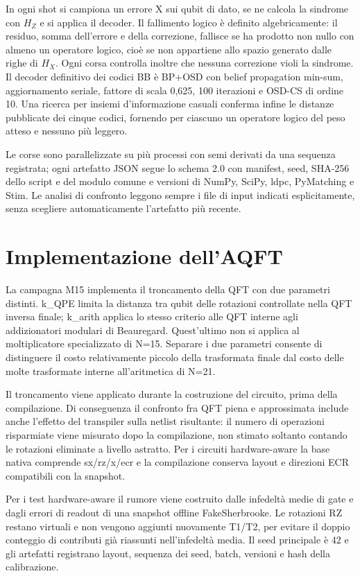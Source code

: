 In ogni shot si campiona un errore X sui qubit di dato, se ne calcola la sindrome con \(H_Z\) e si applica il decoder. Il fallimento logico è definito algebricamente: il residuo, somma dell'errore e della correzione, fallisce se ha prodotto non nullo con almeno un operatore logico, cioè se non appartiene allo spazio generato dalle righe di \(H_X\). Ogni corsa controlla inoltre che nessuna correzione violi la sindrome. Il decoder definitivo dei codici BB è BP+OSD con belief propagation min-sum, aggiornamento seriale, fattore di scala 0,625, 100 iterazioni e OSD-CS di ordine 10. Una ricerca per insiemi d'informazione casuali conferma infine le distanze pubblicate dei cinque codici, fornendo per ciascuno un operatore logico del peso atteso e nessuno più leggero.

Le corse sono parallelizzate su più processi con semi derivati da una sequenza registrata; ogni artefatto JSON segue lo schema 2.0 con manifest, seed, SHA-256 dello script e del modulo comune e versioni di NumPy, SciPy, ldpc, PyMatching e Stim. Le analisi di confronto leggono sempre i file di input indicati esplicitamente, senza scegliere automaticamente l'artefatto più recente.

\section{Implementazione dell'AQFT}\label{sec:finale_4_7}

La campagna M15 implementa il troncamento della QFT con due parametri distinti. k\_QPE limita la distanza tra qubit delle rotazioni controllate nella QFT inversa finale; k\_arith applica lo stesso criterio alle QFT interne agli addizionatori modulari di Beauregard. Quest'ultimo non si applica al moltiplicatore specializzato di N=15. Separare i due parametri consente di distinguere il costo relativamente piccolo della trasformata finale dal costo delle molte trasformate interne all'aritmetica di N=21.

Il troncamento viene applicato durante la costruzione del circuito, prima della compilazione. Di conseguenza il confronto fra QFT piena e approssimata include anche l'effetto del transpiler sulla netlist risultante: il numero di operazioni risparmiate viene misurato dopo la compilazione, non stimato soltanto contando le rotazioni eliminate a livello astratto. Per i circuiti hardware-aware la base nativa comprende sx/rz/x/ecr e la compilazione conserva layout e direzioni ECR compatibili con la snapshot.

Per i test hardware-aware il rumore viene costruito dalle infedeltà medie di gate e dagli errori di readout di una snapshot offline FakeSherbrooke. Le rotazioni RZ restano virtuali e non vengono aggiunti nuovamente T1/T2, per evitare il doppio conteggio di contributi già riassunti nell'infedeltà media. Il seed principale è 42 e gli artefatti registrano layout, sequenza dei seed, batch, versioni e hash della calibrazione.

